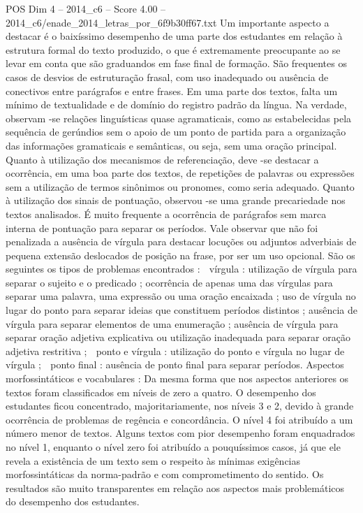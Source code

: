 \begin{textsample}{POS Dim 4 – 2014\_c6 – Score 4.00 – 2014\_c6/enade\_2014\_letras\_por\_6f9b30ff67.txt}
Um importante aspecto a destacar é o baixíssimo desempenho de uma parte dos estudantes em relação à estrutura formal do texto produzido, o que é extremamente preocupante ao se levar em conta que são graduandos em fase final de formação.
São frequentes os casos de desvios de estruturação frasal, com uso inadequado ou ausência de conectivos entre parágrafos e entre frases.
Em uma parte dos textos, falta um mínimo de textualidade e de domínio do registro padrão da língua.
Na verdade, observam -se relações linguísticas quase agramaticais, como as estabelecidas pela sequência de gerúndios sem o apoio de um ponto de partida para a organização das informações gramaticais e semânticas, ou seja, sem uma oração principal.
Quanto à utilização dos mecanismos de referenciação, deve -se destacar a ocorrência, em uma boa parte dos textos, de repetições de palavras ou expressões sem a utilização de termos sinônimos ou pronomes, como seria adequado.
Quanto à utilização dos sinais de pontuação, observou -se uma grande precariedade nos textos analisados.
É muito frequente a ocorrência de parágrafos sem marca interna de pontuação para separar os períodos.
Vale observar que não foi penalizada a ausência de vírgula para destacar locuções ou adjuntos adverbiais de pequena extensão deslocados de posição na frase, por ser um uso opcional.
São os seguintes os tipos de problemas encontrados :  vírgula : utilização de vírgula para separar o sujeito e o predicado ; ocorrência de apenas uma das vírgulas para separar uma palavra, uma expressão ou uma oração encaixada ; uso de vírgula no lugar do ponto para separar ideias que constituem períodos distintos ; ausência de vírgula para separar elementos de uma enumeração ; ausência de vírgula para  separar oração adjetiva explicativa ou utilização inadequada para separar oração adjetiva restritiva ;  ponto e vírgula : utilização do ponto e vírgula no lugar de vírgula ;  ponto final : ausência de ponto final para separar períodos.
Aspectos morfossintáticos e vocabulares : Da mesma forma que nos aspectos anteriores os textos foram classificados em níveis de zero a quatro.
O desempenho dos estudantes ficou concentrado, majoritariamente, nos níveis 3 e 2, devido à grande ocorrência de problemas de regência e concordância.
O nível 4 foi atribuído a um número menor de textos.
Alguns textos com pior desempenho foram enquadrados no nível 1, enquanto o nível zero foi atribuído a pouquíssimos casos, já que ele revela a existência de um texto sem o respeito às mínimas exigências morfossintáticas da norma-padrão e com comprometimento do sentido.
Os resultados são muito transparentes em relação aos aspectos mais problemáticos do desempenho dos estudantes.

\end{textsample}
